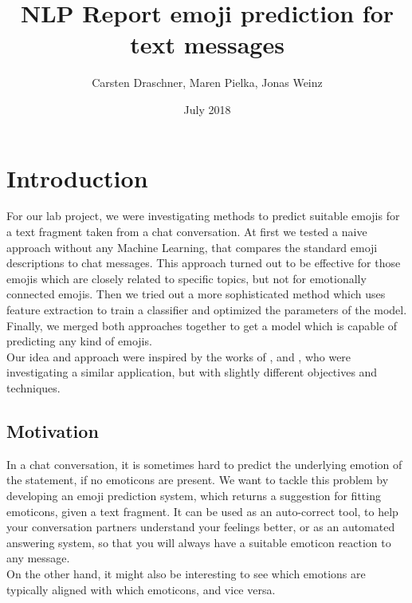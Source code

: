 \documentclass{article}
\title{NLP Report emoji prediction for text messages}
\author{Carsten Draschner, Maren Pielka, Jonas Weinz }
\date{July 2018}
\begin{document}
\maketitle

\tableofcontents

\section{Introduction}
For our lab project, we were investigating methods to predict suitable emojis for a text fragment taken from a chat conversation. At first we tested a naive approach without any Machine Learning, that compares the standard emoji descriptions to chat messages. This approach turned out to be effective for those emojis which are closely related to specific topics, but not for emotionally connected emojis. Then we tried out a more sophisticated method which uses feature extraction to train a classifier and optimized the parameters of the model. Finally, we merged both approaches together to get a model which is capable of predicting any kind of emojis.\\
Our idea and approach were inspired by the works of \citep{hallsmar2016}, \citep{novak2015} and \citep{zhao2017}, who were investigating a similar application, but with slightly different objectives and techniques.

\subsection{Motivation}
In a chat conversation, it is sometimes hard to predict the underlying emotion of the statement, if no emoticons are present. We want to tackle this problem by developing an emoji prediction system, which returns a suggestion for fitting emoticons, given a text fragment. It can be used as an auto-correct tool, to help your conversation partners understand your feelings better, or as an automated answering system, so that you will always have a suitable emoticon reaction to any message. \\
On the other hand, it might also be interesting to see which emotions are typically aligned with which emoticons, and vice versa.
\end{document}
